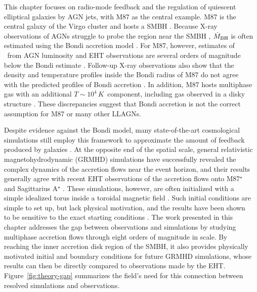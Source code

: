 This chapter focuses on radio-mode feedback and the regulation of quiescent elliptical galaxies by AGN jets, with M87 as the central example.
M87 is the central galaxy of the Virgo cluster and hosts a SMBH \citep[$M_{\rm BH} \approx 6.5\times10^9\, M_{\odot}$;][]{eht_one}.
Because X-ray observations of AGNs struggle to probe the region near the SMBH \citep[e.g.,][]{snios_detection_2019}, $\dot{M}_{\rm BH}$ is often estimated using the Bondi accretion model \citep[][]{bondi_spherically_1952}.
For M87, however, estimates of \mdotbh\ from AGN luminosity and EHT observations are several orders of magnitude below the Bondi estimate \citep[][]{russell_radiative_2013,eht_eight}.
Follow-up X-ray observations also show that the density and temperature profiles inside the Bondi radius of M87 do not agree with the predicted profiles of Bondi accretion \citep[e.g.,][]{russell_inside_2015}.
In addition, M87 hosts multiphase gas with an additional $T \sim 10^4\,K$\ component, including gas observed in a disky structure \citep[e.g.,][]{walsh_m87_2013,lu_ring-like_2023}.
These discrepancies suggest that Bondi accretion is not the correct assumption for M87 or many other LLAGNs.

Despite evidence against the Bondi model, many state-of-the-art cosmological simulations still employ this framework to approximate the amount of feedback produced by galaxies \citep[e.g.,][]{dave_simba_2019,pakmor_millenniumtng_2023}.
At the opposite end of the spatial scale, general relativistic magnetohydrodynamic (GRMHD) simulations have successfully revealed the complex dynamics of the accretion flows near the event horizon, and their results generally agree with recent EHT observations of the accretion flows onto M87$^{\star}$ and Sagittarius A$^{\star}$ \citep{eht_one,eht_sgt_one}.
These simulations, however, are often initialized with a simple idealized torus inside a toroidal magnetic field \citep[e.g.,][]{white_structure_2020,kaaz_nozzle_2023}.
Such initial conditions are simple to set up, but lack physical motivation, and the results have been shown to be sensitive to the exact starting conditions \citep[see][]{davis_magnetohydrodynamics_2020}.
The work presented in this chapter addresses the gap between observations and simulations by studying multiphase accretion flows through eight orders of magnitude in scale.
By reaching the inner accretion disk region of the SMBH, it also provides physically motivated initial and boundary conditions for future GRMHD simulations, whose results can then be directly compared to observations made by the EHT\@.
Figure~\ref{fig:theory-gap} summarizes the field's need for this connection between resolved simulations and observations.


